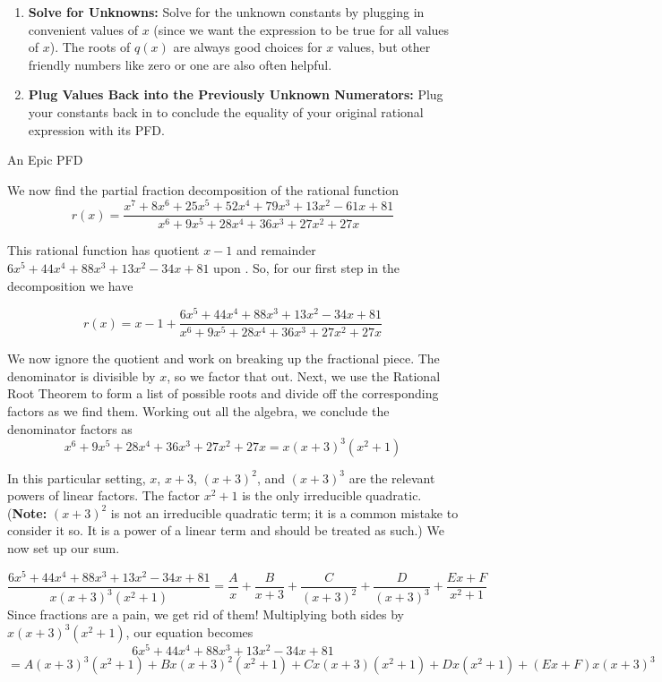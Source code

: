 \begin{enumerate}
\item {\bf Solve for Unknowns:} Solve for the unknown constants by plugging in convenient values of $x$ (since we want the expression to be true for all values of $x$).  The roots of $q(x)$ are always good choices for $x$ values, but other friendly numbers like zero or one are also often helpful.


\item {\bf Plug Values Back into the Previously Unknown Numerators:} Plug your constants back in to conclude the equality of your original rational expression with its PFD.

\end{enumerate}


\begin{example}{An Epic PFD}

We now find the partial fraction decomposition of the rational function $$ r(x)=\frac{x^7+8 x^6+25 x^5+52 x^4+79 x^3+13 x^2-61 x+81}{x^6+9 x^5+28 x^4+36 x^3+27 x^2+27 x}$$

This rational function has quotient $x-1$ and remainder $6 x^5+44 x^4+88 x^3+13 x^2-34 x+81$ upon .  So, for our first step in the decomposition we have 

$$r(x)=x-1+\frac{6 x^5+44 x^4+88 x^3+13 x^2-34 x+81}{x^6+9 x^5+28 x^4+36 x^3+27 x^2+27 x}$$

We now ignore the quotient and work on breaking up the fractional piece.  The denominator is divisible by $x$, so we factor that out.  Next, we use the Rational Root Theorem to form a list of possible roots and divide off the corresponding factors as we find them.  Working out all the algebra, we conclude the denominator factors as $$x^6+9 x^5+28 x^4+36 x^3+27 x^2+27 x=x (x+3)^3 (x^2+1)$$

In this particular setting, $x$, $x+3$, $(x+3)^2$, and $(x+3)^3$ are the relevant powers of linear factors. The factor $x^2+1$ is the only irreducible quadratic.  ({\bf Note:} $(x+3)^2$ is not an irreducible quadratic term; it is a common mistake to consider it so.  It is a power of a linear term and should be treated as such.)  We now set up our sum.

$$ \frac{6 x^5+44 x^4+88 x^3+13 x^2-34 x+81}{x (x+3)^3 (x^2+1)} = \frac{A}{x}+\frac{B}{x+3} +\frac{C}{(x+3)^2} + \frac{D}{(x+3)^3} + \frac{Ex+F}{x^2+1} $$
Since fractions are a pain, we get rid of them!  Multiplying both sides by $x (x+3)^3 (x^2+1)$, our equation becomes
$$ 6 x^5+44 x^4+88 x^3+13 x^2-34 x+81$$ 
$$ = A (x+3)^3 (x^2+1)+Bx (x+3)^2 (x^2+1) +Cx (x+3) (x^2+1) + Dx (x^2+1) + (Ex+F)x (x+3)^3 $$


\end{example}
